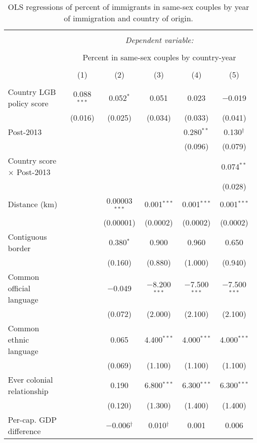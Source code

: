 \documentclass[
  11pt,
]{article}
\begin{document}
\begin{table}[H] \centering 
  \caption{OLS regressions of percent of immigrants in same-sex couples by year of immigration and country of origin.} 
  \label{tab:country-props-full} 
\begin{tabular}{@{\extracolsep{5pt}}lccccc} 
\\[-1.8ex]\hline 
\hline \\[-1.8ex] 
 & \multicolumn{5}{c}{\textit{Dependent variable:}} \\ 
\cline{2-6} 
\\[-1.8ex] & \multicolumn{5}{c}{Percent in same-sex couples by country-year} \\ 
\\[-1.8ex] & (1) & (2) & (3) & (4) & (5)\\ 
\hline \\[-1.8ex] 
 Country LGB policy score & 0.088$^{***}$ & 0.052$^{*}$ & 0.051 & 0.023 & $-$0.019 \\ 
  & (0.016) & (0.025) & (0.034) & (0.033) & (0.041) \\ 
  Post-2013 &  &  &  & 0.280$^{**}$ & 0.130$^{†}$ \\ 
  &  &  &  & (0.096) & (0.079) \\ 
  Country score × Post-2013 &  &  &  &  & 0.074$^{**}$ \\ 
  &  &  &  &  & (0.028) \\ 
  Distance (km) &  & 0.00003$^{***}$ & 0.001$^{***}$ & 0.001$^{***}$ & 0.001$^{***}$ \\ 
  &  & (0.00001) & (0.0002) & (0.0002) & (0.0002) \\ 
  Contiguous border &  & 0.380$^{*}$ & 0.900 & 0.960 & 0.650 \\ 
  &  & (0.160) & (0.880) & (1.000) & (0.940) \\ 
  Common official language &  & $-$0.049 & $-$8.200$^{***}$ & $-$7.500$^{***}$ & $-$7.500$^{***}$ \\ 
  &  & (0.072) & (2.000) & (2.100) & (2.100) \\ 
  Common ethnic language &  & 0.065 & 4.400$^{***}$ & 4.000$^{***}$ & 4.000$^{***}$ \\ 
  &  & (0.069) & (1.100) & (1.100) & (1.100) \\ 
  Ever colonial relationship &  & 0.190 & 6.800$^{***}$ & 6.300$^{***}$ & 6.300$^{***}$ \\ 
  &  & (0.120) & (1.300) & (1.400) & (1.400) \\ 
  Per-cap. GDP difference &  & $-$0.006$^{†}$ & 0.010$^{†}$ & 0.001 & 0.006 \\ 

\end{tabular}
\end{table}
\end{document}
